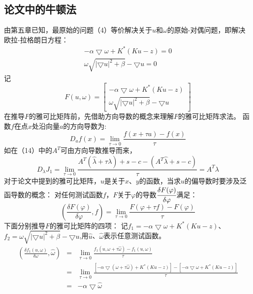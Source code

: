 \documentclass[a4paper,12pt]{article}
\begin{document}
\subsection{论文中的牛顿法}
由第五章已知，最原始的问题（4）等价解决关于$u$和$\omega$的原始-对偶问题，即解决欧拉-拉格朗日方程：
\begin{equation}
\begin{array}{c}
-\alpha \bigtriangledown \omega +K^*(Ku-z)=0\\
\omega \sqrt{|\bigtriangledown u|^2+\beta}-\bigtriangledown u=0
\end{array}
\end{equation}
记
\begin{equation}
F(u,\omega)=
\left[
\begin{array}{c}
-\alpha \bigtriangledown \omega +K^*(Ku-z)\\
\omega \sqrt{|\bigtriangledown u|^2+\beta}-\bigtriangledown u
\end{array}
\right]
\end{equation}
在推导$F$的雅可比矩阵前，先借助方向导数的概念来理解$F$的雅可比矩阵求法。
函数$f$在点$x$处沿向量$a$的方向导数为:
\begin{equation}
D_af(x)=\lim_{\tau \to 0} \frac{f(x+\tau a)-f(x)}{\tau}
\end{equation}
如在（14）中的$A^T$可由方向导数推导而来，
\begin{equation}
D_\lambda J_1=\lim_{\tau \to 0} \frac{A^T(\hat{\lambda}+\tau \lambda)+s-c-(A^T\hat{\lambda}+s-c)}{\tau}=A^T \lambda
\end{equation}
对于论文中提到的雅可比矩阵，$u$是关于$x$、$y$的函数，当求$u$的偏导数时要涉及泛函导数的概念：
对任何测试函数$f$，$F$关于$\varphi$的导数$\cfrac{\delta F(\varphi)}{\delta \varphi}$满足：
\begin{equation}
\left(
\frac{\delta F(\varphi)}{\delta \varphi},f
\right)
=\lim_{\tau \to 0}\frac{F(\varphi+\tau f)-F(\varphi)}{\tau}
\end{equation}
下面分别推导$F$的雅可比矩阵的四项：
记$f_1=-\alpha \bigtriangledown \omega +K^*(Ku-z)$、$f_2=\omega \sqrt{|\bigtriangledown u|^2+\beta}-\bigtriangledown u$,用$\hat{u}$、$\hat{\omega}$表示任意测试函数。
\begin{eqnarray}
\left(
\frac{\delta f_1(u,\omega)}{\delta \omega},\hat{\omega} 
\right)
&=&\lim_{\tau \to 0}\frac{f_1(u,\omega+\tau \hat{\omega})-f_1(u,\omega)}{\tau}
\nonumber\\
 &=&\lim_{\tau \to 0}\frac{[-\alpha \bigtriangledown (\omega+\tau \hat{\omega}) +K^*(Ku-z)]-[-\alpha \bigtriangledown \omega +K^*(Ku-z)]}{\tau}
\nonumber\\
&=&-\alpha \bigtriangledown \hat{\omega}
\end{eqnarray}
\end{document}
